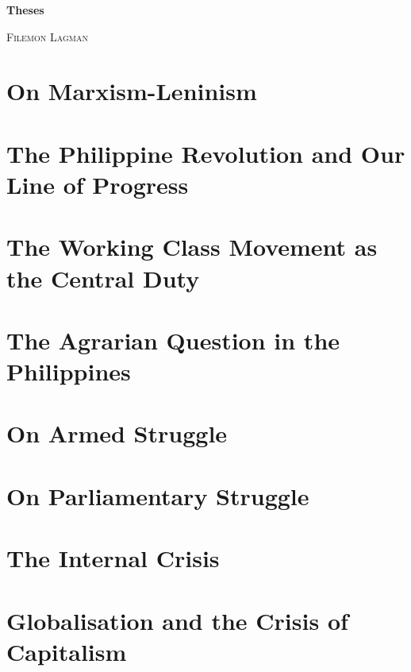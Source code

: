 \documentclass[a4paper,11pt,onesided]{report}
\begin{document}
\begin{titlepage}
    \begin{center}
        \vspace*{1cm}
 
        {\Huge  \textbf{Theses}}
 
        \vspace{0.5cm}
        {\textsc{Filemon Lagman}}
                   
        \vspace{1.5cm}
        
        {}

        \vspace{1.5cm}
        {}

        \vspace{0.5cm}
        {}

        \vspace{0.5cm}

        \vfill
    \end{center}
 \end{titlepage}

\tableofcontents




\chapter{On Marxism-Leninism}
\chapter{The Philippine Revolution and Our Line of Progress}
\chapter{The Working Class Movement as the Central Duty}
\chapter{The Agrarian Question in the Philippines}
\chapter{On Armed Struggle}
\chapter{On Parliamentary Struggle}
\chapter{The Internal Crisis}
\chapter{Globalisation and the Crisis of Capitalism}
\end{document}
